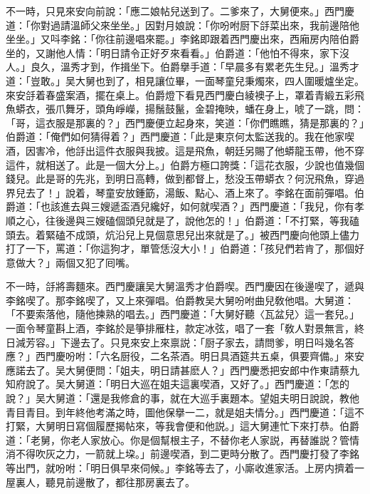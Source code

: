 不一時，只見來安向前說：「應二娘帖兒送到了。二爹來了，大舅便來。」西門慶道：「你對過請溫師父來坐坐。」因對月娘說：「你吩咐厨下㧱菜出來，我前邊陪他坐坐。」又呌李銘：「你往前邊唱來罷。」李銘即跟着西門慶出來，西廂房内陪伯爵坐的，又謝他人情：「明日請令正好歹來看看。」伯爵道：「他怕不得來，家下沒人。」良久，溫秀才到，作揖坐下。伯爵擧手道：「早晨多有累老先生兒。」溫秀才道：「豈敢。」吴大舅也到了，相見讓位畢，一面琴童兒秉燭來，四人圍暖爐坐定。來安㧱着春盛案酒，擺在桌上。伯爵燈下看見西門慶白綾襖子上，罩着青緞五彩飛魚蟒衣，張爪舞牙，頭角崢嶸，揚鬚鼓鬣，金碧掩映，蟠在身上，唬了一跳，問：「哥，這衣服是那裏的？」西門慶便立起身來，笑道：「你們瞧瞧，猜是那裏的？」伯爵道：「俺們如何猜得着？」西門慶道：「此是東京何太監送我的。我在他家喫酒，因害冷，他㧱出這件衣服與我披。這是飛魚，朝廷另賜了他蟒龍玉帶，他不穿這件，就相送了。此是一個大分上。」伯爵方極口誇獎：「這花衣服，少說也值幾個錢兒。此是哥的先兆，到明日高轉，做到都督上，愁没玉帶蟒衣？何況飛魚，穿過界兒去了！」說着，琴童安放鍾筯，湯飯、點心、酒上來了。李銘在面前彈唱。伯爵道：「也該進去與三嫂遞盃酒兒纔好，如何就喫酒？」西門慶道：「我兒，你有孝順之心，往後邊與三嫂磕個頭兒就是了，說他怎的！」伯爵道：「不打緊，等我磕頭去。着緊磕不成頭，炕沿兒上見個意思兒出來就是了。」被西門慶向他頭上儘力打了一下，罵道：「你這狗才，單管恁沒大小！」伯爵道：「孩兒們若肯了，那個好意做大？」兩個又犯了囘嘴。

不一時，㧱將壽麵來。西門慶讓吴大舅溫秀才伯爵喫。西門慶因在後邊喫了，遞與李銘喫了。那李銘喫了，又上來彈唱。伯爵教吴大舅吩咐曲兒敎他唱。大舅道：「不要索落他，隨他揀熟的唱去。」西門慶道：「大舅好聽〈瓦盆兒〉這一套兒。」一面令琴童斟上酒，李銘於是箏排雁柱，款定冰弦，唱了一套「敎人對景無言，終日減芳容。」下邊去了。只見來安上來禀説：「厨子家去，請問爹，明日呌幾名答應？」西門慶吩咐：「六名厨役，二名茶酒。明日具酒筵共五桌，俱要齊備。」來安應諾去了。吴大舅便問：「姐夫，明日請甚麽人？」西門慶悉把安郎中作東請蔡九知府說了。吴大舅道：「明日大巡在姐夫這裏喫酒，又好了。」西門慶道：「怎的說？」吴大舅道：「還是我修倉的事，就在大巡手裏題本。望姐夫明日說說，教他青目青目。到年終他考滿之時，圖他保擧一二，就是姐夫情分。」西門慶道：「這不打緊，大舅明日寫個履歷揭帖來，等我會便和他説。」這大舅連忙下來打恭。伯爵道：「老舅，你老人家放心。你是個幫根主子，不替你老人家説，再替誰説？管情消不得吹灰之力，一箭就上垜。」前邊喫酒，到二更時分散了。西門慶打發了李銘等出門，就吩咐：「明日俱早來伺候。」李銘等去了，小廝收進家活。上房内擠着一屋裏人，聽見前邊散了，都往那房裏去了。

